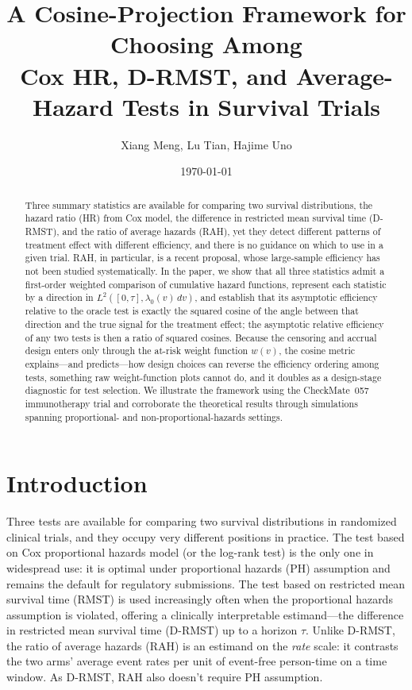 \documentclass[12pt]{article}
\title{A Cosine-Projection Framework for Choosing Among\\
       Cox HR, D-RMST, and Average-Hazard Tests in Survival Trials}
\author{Xiang Meng, Lu Tian, Hajime Uno}
\date{\today}
\newcommand{\dd}{\,d}
\begin{document}
\maketitle

\begin{abstract}
Three summary statistics are available for comparing two
survival distributions, the hazard ratio (HR) from Cox model, the difference in restricted mean survival time (D-RMST), and the ratio of average hazards
(RAH), yet they detect different patterns of treatment effect with different efficiency, and there is no guidance on
which to use in a given trial.  RAH, in particular, is a recent
proposal, whose large-sample efficiency has not been studied systematically. In the paper, we show that all three statistics admit a first-order weighted comparison
of cumulative hazard functions, represent each statistic by a direction in
$L^2([0,\tau],\lambda_0(v)\dd v)$, and establish that its asymptotic
efficiency relative to the oracle test is exactly the squared cosine of the
angle between that direction and the true signal for the treatment effect; the asymptotic relative efficiency of any two tests is then a ratio of squared cosines.
Because the censoring and accrual design enters only through the at-risk
weight function $w(v)$, the cosine metric explains---and predicts---how design
choices can reverse the efficiency ordering among tests, something raw
weight-function plots cannot do, and it doubles as a design-stage
diagnostic for test selection.
We illustrate the framework using the CheckMate~057 immunotherapy trial and
corroborate the theoretical results through simulations spanning proportional- and
non-proportional-hazards settings.
\end{abstract}

\section{Introduction}
\label{sec:intro}


Three tests are available for comparing two survival distributions in
randomized clinical trials, and they occupy very different positions in
practice.
The test based on Cox proportional hazards model (or the log-rank test) is the only one in widespread use: it is
optimal under proportional hazards (PH) assumption and remains the default for
regulatory submissions.
The test based on restricted mean survival time (RMST) \citep{Uno2014} is
used increasingly often when the proportional hazards assumption is
violated, offering a clinically interpretable estimand---the difference
in restricted mean survival time (D-RMST) up to a horizon $\tau$.
Unlike D-RMST, the ratio of average hazards (RAH) \citep{Uno2023} is an estimand on the \emph{rate} scale: it contrasts the two arms' average event rates per unit of event-free person-time on a time window. As D-RMST, RAH also doesn't require PH assumption.
\end{document}
